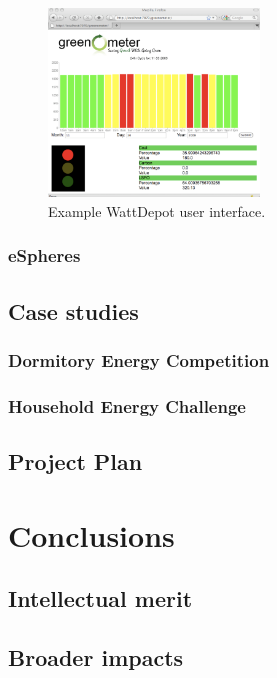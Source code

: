 \begin{figure}[th]
  \center
  \includegraphics[width=0.5\textwidth]{greenometer.2.eps}
  \caption{\small Example WattDepot user interface.}
 \label{fig:WattDepotUI}
\end{figure} 


\subsubsection{eSpheres}






\subsection{Case studies}

\subsubsection{Dormitory Energy Competition}

\subsubsection{Household Energy Challenge}

\subsection{Project Plan}


\section{Conclusions}
\label{sec:merit}

\subsection{Intellectual merit}

\subsection{Broader impacts}










